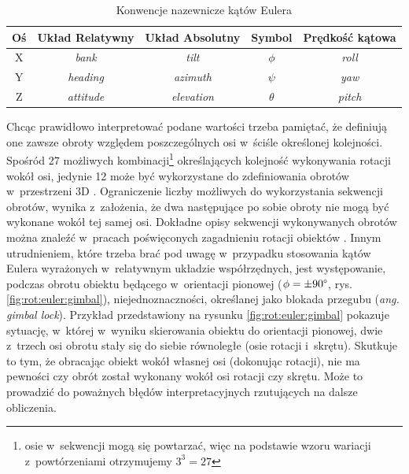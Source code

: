 																											
																											
\begin{table}[!htb]
	\centering
	\caption{Konwencje nazewnicze kątów Eulera}
	\label{tab:appx:rot:eulerNames} 
	\begin{tabular}{|c|c|c|c|c|}
		\hline
		Oś & Układ Relatywny & Układ Absolutny & Symbol   & Prędkość kątowa \\
		\hline
		X   & \emph{bank}      & \emph{tilt}      & $\phi$   & \emph{roll}         \\
		Y   & \emph{heading}   & \emph{azimuth}   & $\psi$   & \emph{yaw}          \\ 
		Z   & \emph{attitude}  & \emph{elevation} & $\theta$ & \emph{pitch}        \\
		\hline
	\end{tabular} 
\end{table}
																													
Chcąc prawidłowo interpretować podane wartości trzeba pamiętać, że definiują one zawsze obroty względem poszczególnych osi w~ściśle określonej kolejności. Spośród 27 możliwych kombinacji\footnote{osie w~sekwencji mogą się powtarzać, więc na podstawie wzoru wariacji z~powtórzeniami otrzymujemy $3^3 = 27$} określających kolejność wykonywania rotacji wokół osi, jedynie 12 może być wykorzystane do zdefiniowania obrotów w~przestrzeni 3D \cite{Diebel2006}. Ograniczenie liczby możliwych do wykorzystania sekwencji obrotów, wynika z~założenia, że dwa następujące po sobie obroty nie mogą być wykonane wokół tej samej osi. Dokładne opisy sekwencji wykonywanych obrotów można znaleźć w~pracach poświęconych zagadnieniu rotacji obiektów \cite{Pio1966, Diebel2006}. Innym utrudnieniem, które trzeba brać pod uwagę w~przypadku stosowania kątów Eulera wyrażonych w~relatywnym układzie współrzędnych, jest występowanie, podczas obrotu obiektu będącego w~orientacji pionowej ($\phi=\pm90\degree$, rys. \ref{fig:rot:euler:gimbal}), niejednoznaczności, określanej jako blokada przegubu (\emph{ang. gimbal lock}). Przykład przedstawiony na rysunku \ref{fig:rot:euler:gimbal} pokazuje sytuację, w~której w~wyniku skierowania obiektu do orientacji pionowej, dwie z~trzech osi obrotu stały się do siebie równoległe (osie rotacji i~skrętu). Skutkuje to tym, że obracając obiekt wokół własnej osi (dokonując rotacji), nie ma pewności czy obrót został wykonany wokół osi rotacji czy skrętu. Może to prowadzić do poważnych błędów interpretacyjnych rzutujących na dalsze obliczenia.

